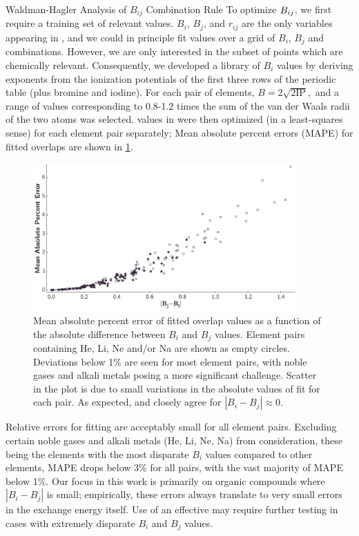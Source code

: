 \begin{section}{Waldman-Hagler Analysis of $B_{ij}$ Combination Rule}
To optimize $B_{ij}$, we first require a training set of
relevant \sijexact values. $B_i$, $B_j$, and $r_{ij}$ are the only
variables appearing in \sijexact, and we could in principle fit \B values over a
grid of $B_i$, $B_j$ and \R
combinations. However, we are only interested in the subset of 
points which are chemically relevant.
Consequently, we developed a
library of $B_i$ values by deriving exponents from the ionization potentials of the first three rows of
the periodic table (plus bromine and iodine).
For each pair of elements, $B = 2\sqrt{2\text{IP}},$\cite{Yu2011} and a range of \R
values corresponding to 0.8-1.2 times the sum of the van der Waals radii of the two
atoms was selected. \B values in \sijapprox were
then optimized (in a least-squares sense) for each element pair separately;
Mean absolute percent errors (MAPE) for fitted overlaps are shown
in \cref{fig:bij_mape}. 


    \begin{figure}[t]
    \includegraphics[width=0.9\textwidth]{isotropic/si/bij_mape.pdf}
    \caption{
        Mean absolute percent error of fitted overlap values as a function of the
        absolute difference between $B_i$ and $B_j$ values. Element pairs containing
        He, Li, Ne and/or Na are shown as empty circles.  Deviations below 1\% are
        seen for most element pairs, with noble gases and alkali metals posing a more
        significant challenge. Scatter in the plot is due to small variations in the
        absolute values of \R fit for each pair.  As expected, \sijexact and
        \sijapprox closely agree for $|B_i - B_j| \approx 0$. 
           		  }
    \label{fig:bij_mape}
    \end{figure}

Relative errors for fitting are acceptably small for all element pairs.
Excluding certain noble gases and alkali metals (He, Li, Ne,
Na) from consideration, these being the elements with the most disparate $B_i$
values compared to other elements, MAPE drops below 3\% for all pairs, with
the vast majority of MAPE below 1\%. Our focus in this work is primarily on
organic compounds where $|B_i - B_j|$ is small; empirically, these errors always translate to very small
errors in the exchange energy itself.  
Use of an effective \B may require further testing in cases with extremely
disparate $B_i$ and $B_j$ values.


\end{section}
